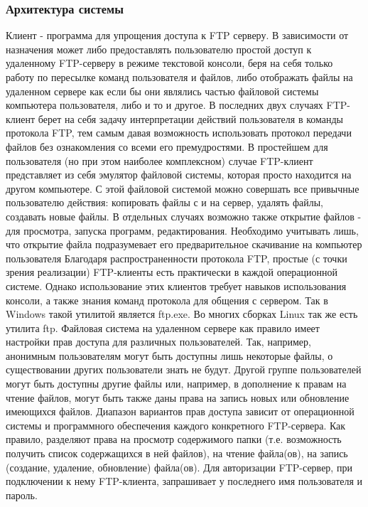 \subsubsection{Архитектура системы}
Клиент - программа для упрощения доступа к FTP серверу. 
В зависимости от назначения может либо предоставлять пользователю простой доступ к удаленному FTP-серверу в режиме текстовой консоли, беря на себя только работу по пересылке команд пользователя и файлов, либо отображать файлы на удаленном сервере как если бы они являлись частью файловой системы компьютера пользователя, либо и то и другое. 
В последних двух случаях FTP-клиент берет на себя задачу интерпретации действий пользователя в команды протокола FTP, тем самым давая возможность использовать протокол передачи файлов без ознакомления со всеми его премудростями. 
В простейшем для пользователя (но при этом наиболее комплексном) случае FTP-клиент представляет из себя эмулятор файловой системы, которая просто находится на другом компьютере. 
С этой файловой системой можно совершать все привычные пользователю действия: копировать файлы с и на сервер, удалять файлы, создавать новые файлы. 
В отдельных случаях возможно также открытие файлов - для просмотра, запуска программ, редактирования. Необходимо учитывать лишь, что открытие файла подразумевает его предварительное скачивание на компьютер пользователя Благодаря распространенности протокола FTP, простые (с точки зрения реализации) FTP-клиенты есть практически в каждой операционной системе. 
Однако использование этих клиентов требует навыков использования консоли, а также знания команд протокола для общения с сервером. 
Так в Windows такой утилитой является ftp.exe. 
Во многих сборках Linux так же есть утилита ftp. 
Файловая система на удаленном сервере как правило имеет настройки прав доступа для различных пользователей. 
Так, например, анонимным пользователям могут быть доступны лишь некоторые файлы, о существовании других пользователи знать не будут. 
Другой группе пользователей могут быть доступны другие файлы или, например, в дополнение к правам на чтение файлов, могут быть также даны права на запись новых или обновление имеющихся файлов. 
Диапазон вариантов прав доступа зависит от операционной системы и программного обеспечения каждого конкретного FTP-сервера. 
Как правило, разделяют права на просмотр содержимого папки (т.е. возможность получить список содержащихся в ней файлов), на чтение файла(ов), на запись (создание, удаление, обновление) файла(ов). 
Для авторизации FTP-сервер, при подключении к нему FTP-клиента, запрашивает у последнего имя пользователя и пароль. 
